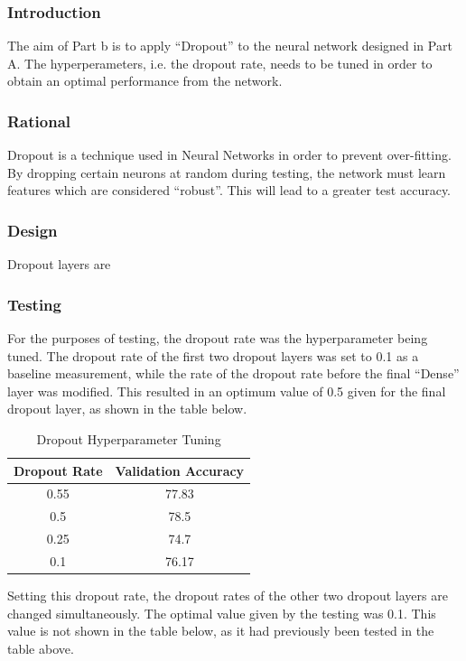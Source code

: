 \subsubsection{Introduction}

The aim of Part b is to apply ``Dropout'' to the neural network designed in Part
A. The hyperperameters, i.e. the dropout rate, needs to be tuned in order to
obtain an optimal performance from the network.

\subsubsection{Rational}

Dropout is a technique used in Neural Networks in order to prevent over-fitting.
By dropping certain neurons at random during testing, the network must learn
features which are considered ``robust''. This will lead to a greater test
accuracy.

\subsubsection{Design}

Dropout layers are

\subsubsection{Testing}

For the purposes of testing, the dropout rate was the hyperparameter being
tuned. The dropout rate of the first two dropout layers was set to 0.1 as a
baseline measurement, while the rate of the dropout rate before the final
``Dense'' layer was modified. This resulted in an optimum value of 0.5 given for
the final dropout layer, as shown in the table below.

\begin{table}[H]
	\centering
	\caption{Dropout Hyperparameter Tuning}
	\label{tab:d1hyp}
	\begin{tabular}{|c|c|}
	\hline
	Dropout Rate & Validation Accuracy \\
	\hline
	0.55 & 77.83\\
	0.5 & 78.5 \\
	0.25 & 74.7 \\
	0.1 & 76.17 \\
	\hline
	\end{tabular}
\end{table}

Setting this dropout rate, the dropout rates of the other two dropout layers are
changed simultaneously. The optimal value given by the testing was 0.1. This
value is not shown in the table below, as it had previously been tested in the
table above.

